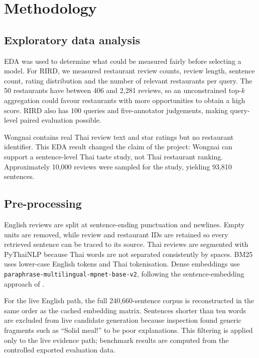 \chapter{Methodology}

\section{Exploratory data analysis}
EDA was used to determine what could be measured fairly before selecting a model. For RIRD,
we measured restaurant review counts, review length, sentence count, rating distribution and
the number of relevant restaurants per query. The 50 restaurants have between 406 and 2,281
reviews, so an unconstrained top-$k$ aggregation could favour restaurants with more
opportunities to obtain a high score. RIRD also has 100 queries and five-annotator judgements,
making query-level paired evaluation possible.

Wongnai contains real Thai review text and star ratings but no restaurant identifier. This EDA
result changed the claim of the project: Wongnai can support a sentence-level Thai taste study,
not Thai restaurant ranking. Approximately 10,000 reviews were sampled for the study, yielding
93,810 sentences.

\section{Pre-processing}
English reviews are split at sentence-ending punctuation and newlines. Empty units are removed,
while review and restaurant IDs are retained so every retrieved sentence can be traced to its
source. Thai reviews are segmented with PyThaiNLP because Thai words are not separated
consistently by spaces. BM25 uses lower-case English
tokens and Thai tokenisation. Dense embeddings use
\texttt{paraphrase-multilingual-mpnet-base-v2}, following the sentence-embedding approach of
\citet{reimers2019sbert}.

For the live English path, the full 240,660-sentence corpus is reconstructed in the same order
as the cached embedding matrix. Sentences shorter than ten words are excluded from live
candidate generation because inspection found generic fragments such as ``Solid meal!'' to be
poor explanations. This filtering is applied only to the live evidence path; benchmark results
are computed from the controlled exported evaluation data.

